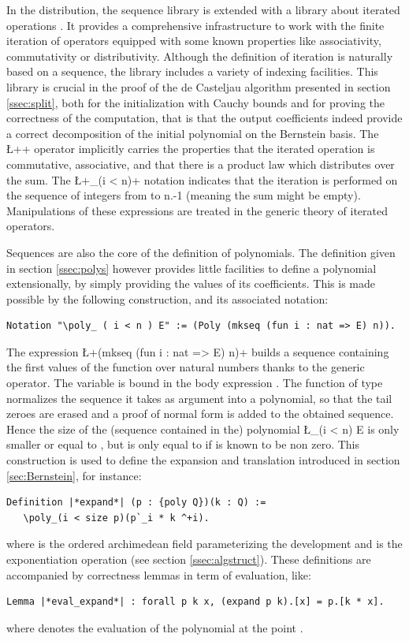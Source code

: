 \documentclass{mscs}
\begin{document}
In the \ssr{} distribution, the sequence library is extended with a
library about iterated operations \cite{BGOBP:BIG08}. It
 provides a comprehensive infrastructure to work with the finite
iteration of operators equipped with some known properties like
associativity, commutativity or distributivity. Although the
definition of iteration is naturally based on a sequence, the library
includes a variety of indexing facilities. This library is
crucial in the proof of the de Casteljau algorithm presented in
section \ref{ssec:split}, both for the initialization with Cauchy
bounds and for proving the correctness of the computation, that is
that the output coefficients indeed provide a correct decomposition of
the initial polynomial on the Bernstein basis. The \L+\sum+ 
operator implicitly carries the properties that the iterated
operation is commutative, associative, and that there is a
product law which distributes over the sum. The \L+\sum_(i < n)+ notation
indicates that the iteration is performed on the sequence of integers
from  to {n.-1} (meaning the sum might be empty).
Manipulations of these expressions are treated in the generic
theory of iterated operators.

Sequences are also the core of the definition of polynomials. The
definition given in section \ref{ssec:polys} however provides little
facilities to define a polynomial extensionally, by simply providing
the values of its coefficients. This is made possible by the following
construction, and its associated notation:
\begin{lstlisting}
Notation "\poly_ ( i < n ) E" := (Poly (mkseq (fun i : nat => E) n)).
\end{lstlisting}
The expression \L+(mkseq (fun i : nat => E) n)+ builds a sequence 
containing the  first values of the function  over natural
numbers thanks to the generic  operator. The variable 
is bound in the body expression . The  function of type\\
normalizes the sequence it takes as argument into a polynomial, so
that the tail zeroes are erased and a proof of normal form is added to
the obtained sequence. Hence the size of the (sequence contained in
the) polynomial \L{\poly_(i < n) E} is only smaller or equal to ,
but is only equal to  if  is known to be non zero.
This construction is used to define the expansion and translation
introduced in section \ref{sec:Bernstein}, for instance:
\begin{lstlisting}
Definition |*expand*| (p : {poly Q})(k : Q) := 
   \poly_(i < size p)(p`_i * k ^+i).
\end{lstlisting}
where  is the ordered archimedean field parameterizing the
development and \C{^+} is the exponentiation operation (see section
\ref{ssec:algstruct}). These
definitions are accompanied by correctness lemmas in term of
evaluation, like:
\begin{lstlisting}
Lemma |*eval_expand*| : forall p k x, (expand p k).[x] = p.[k * x].
\end{lstlisting}
where  denotes the evaluation of the polynomial 
at the point .
\end{document}
